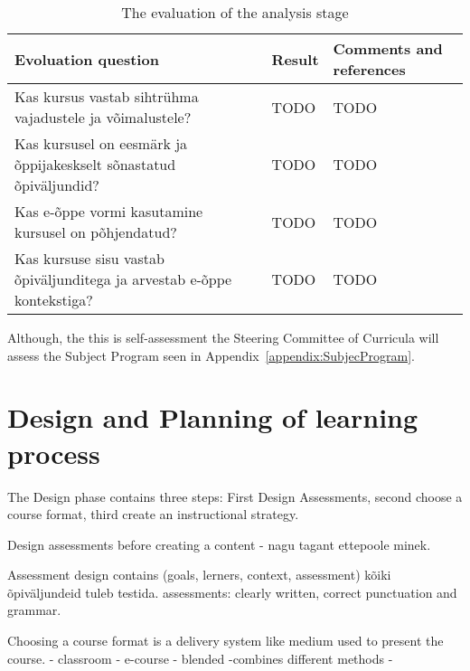 \begin{table}[h]
\centering
\caption{The evaluation of the analysis stage }
\begin{tabular}{|p{6cm}|p{2cm}|p{5cm}|}
\hline 
\color{blue} Evoluation question & \color{blue} Result & \color{blue} Comments and references \\ 
\hline 
Kas kursus vastab sihtrühma vajadustele ja võimalustele? & TODO & TODO \\ 
\hline 
Kas kursusel on eesmärk ja õppijakeskselt sõnastatud õpiväljundid? & TODO & TODO \\ 
\hline 
Kas e-õppe vormi kasutamine kursusel on põhjendatud? & TODO & TODO \\ 
\hline 
Kas kursuse sisu vastab õpiväljunditega ja arvestab e-õppe kontekstiga? & TODO & TODO \\ 
\hline 
\end{tabular} 
\label{tab:evoluation_analysis}
\end{table}

Although, the this is self-assessment the Steering Committee of Curricula will assess the Subject Program seen in Appendix~\ref{appendix:SubjecProgram}.

%
%
%

\section{Design and Planning of learning process}

The Design phase contains three steps: First Design Assessments, second choose a course format, third create an instructional strategy.

Design assessments before creating a content - nagu tagant ettepoole minek.

Assessment design contains (goals, lerners, context, assessment)
kõiki õpiväljundeid tuleb testida.
assessments: clearly written, correct punctuation and grammar.

Choosing a course format is a delivery system like medium used to present the course.
- classroom
- e-course
- blended -combines different methods
- 

